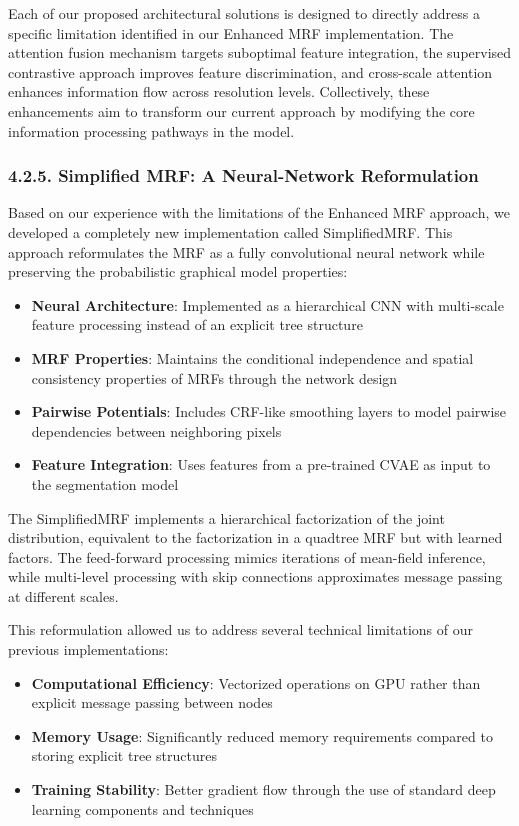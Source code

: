 \documentclass[conference]{IEEEtran}
\begin{document}
Each of our proposed architectural solutions is designed to directly address a specific limitation identified in our Enhanced MRF implementation. The attention fusion mechanism targets suboptimal feature integration, the supervised contrastive approach improves feature discrimination, and cross-scale attention enhances information flow across resolution levels. Collectively, these enhancements aim to transform our current approach by modifying the core information processing pathways in the model.

\subsubsection*{4.2.5. Simplified MRF: A Neural-Network Reformulation}

Based on our experience with the limitations of the Enhanced MRF approach, we developed a completely new implementation called SimplifiedMRF. This approach reformulates the MRF as a fully convolutional neural network while preserving the probabilistic graphical model properties:

\begin{itemize}
    \item \textbf{Neural Architecture}: Implemented as a hierarchical CNN with multi-scale feature processing instead of an explicit tree structure
    \item \textbf{MRF Properties}: Maintains the conditional independence and spatial consistency properties of MRFs through the network design
    \item \textbf{Pairwise Potentials}: Includes CRF-like smoothing layers to model pairwise dependencies between neighboring pixels
    \item \textbf{Feature Integration}: Uses features from a pre-trained CVAE as input to the segmentation model
\end{itemize}

The SimplifiedMRF implements a hierarchical factorization of the joint distribution, equivalent to the factorization in a quadtree MRF but with learned factors. The feed-forward processing mimics iterations of mean-field inference, while multi-level processing with skip connections approximates message passing at different scales.

This reformulation allowed us to address several technical limitations of our previous implementations:

\begin{itemize}
    \item \textbf{Computational Efficiency}: Vectorized operations on GPU rather than explicit message passing between nodes
    \item \textbf{Memory Usage}: Significantly reduced memory requirements compared to storing explicit tree structures
    \item \textbf{Training Stability}: Better gradient flow through the use of standard deep learning components and techniques
\end{itemize}
\end{document}
